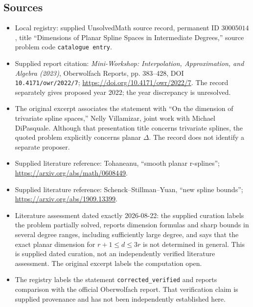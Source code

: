 \documentclass[11pt]{article}
\begin{document}
\subsection{Sources}
\begin{itemize}
\item Local registry: supplied UnsolvedMath source record, permanent ID \(30005014\), title ``Dimensions of Planar Spline Spaces in Intermediate Degrees,'' source problem code \texttt{catalogue entry}.
\item Supplied report citation: \emph{Mini-Workshop: Interpolation, Approximation, and Algebra (2023)}, Oberwolfach Reports, pp. 383--428, DOI \texttt{10.4171/owr/2022/7}; \url{https://doi.org/10.4171/owr/2022/7}. The record separately gives proposed year 2022; the year discrepancy is unresolved.
\item The original excerpt associates the statement with ``On the dimension of trivariate spline spaces,'' Nelly Villamizar, joint work with Michael DiPasquale. Although that presentation title concerns trivariate splines, the quoted problem explicitly concerns planar \(\Delta\). The record does not identify a separate proposer.
\item Supplied literature reference: Tohaneanu, ``smooth planar r-splines''; \url{https://arxiv.org/abs/math/0608449}.
\item Supplied literature reference: Schenck--Stillman--Yuan, ``new spline bounds''; \url{https://arxiv.org/abs/1909.13399}.
\item Literature assessment dated exactly 2026-08-22: the supplied curation labels the problem partially solved, reports dimension formulas and sharp bounds in several degree ranges, including sufficiently large degree, and says that the exact planar dimension for \(r+1\leq d\leq3r\) is not determined in general. This is supplied dated curation, not an independently verified literature assessment. The original excerpt labels the computation open.
\item The registry labels the statement \texttt{corrected\_verified} and reports comparison with the official Oberwolfach report. That verification claim is supplied provenance and has not been independently established here.
\end{itemize}
\end{document}
